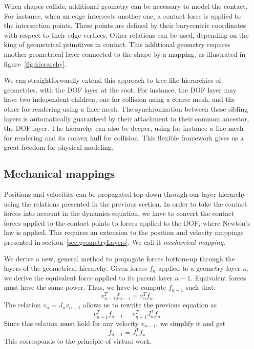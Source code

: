 When shapes collide, additional geometry can be necessary to model the contact.
For instance, when an edge intersects another one, a contact force is applied to the intersection points.
These points are defined by their barycentric coordinates with respect to their edge vertices. Other relations can be used, depending on the king of geometrical primitives in contact.
This additional geometry requires another geometrical layer connected to the shape by a mapping, as illustrated in figure~\ref{fig:hierarchy}.

We can straightforwardly extend this approach to tree-like hierarchies of geometries, with the DOF layer at the root. 
For instance, the DOF layer may have two independent children, one for collision using a coarse mesh, and the other for rendering using a finer mesh. The synchronization between these sibling layers is automatically guaranteed by their attachment to their common ancestor, the DOF layer.
The hierarchy can also be deeper, using for instance a fine mesh for rendering and its convex hull for collision.
This flexible framework gives us a great freedom for physical modeling.

\subsection{Mechanical mappings}
Positions and velocities can be propagated top-down through our layer hierarchy using the relations presented in the previous section.
In order to take the contact forces into account in the dynamics equation, we have to convert the contact forces applied to the contact points to forces applied to the DOF, where Newton's law is applied. 
This requires an extension to the position and velocity amppings presented in section~\ref{sec:geometryLayers}. We call it \textit{mechanical mapping}.

We derive a new, general method to propagate forces bottom-up through the layers of the geometrical hierarchy.
Given forces $f_n$ applied to a geometry layer $n$, we derive the equivalent force applied to its parent layer $n-1$. 
Equivalent forces must have the same power. Thus, we have to compute $f_{n-1}$ such that:
$$
v_{n-1}^T f_{n-1} = v_n^T f_n
$$
The relation $v_{n} = J_{n}v_{n-1}$ allows us to rewrite the previous equation as
$$
v_{n-1}^T f_{n-1} = v_{n-1}^T J_{n}^T f_n
$$
Since this relation must hold for any velocity $v_{n-1}$, we simplify it and get
\begin{equation} \label{eq:mapF}
f_{n-1} = J_n^T f_n
\end{equation}
This corresponds to the principle of virtual work.

